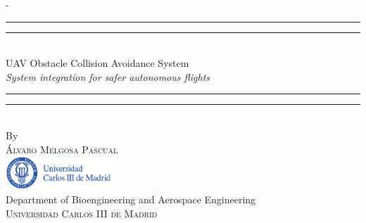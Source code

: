 %
%
% 
%
%
\begin{titlingpage}
\begin{SingleSpace}
\calccentering{\unitlength} 
\begin{adjustwidth*}{\unitlength}{-\unitlength}
\vspace*{13mm}
\begin{center}
\rule[0.5ex]{\linewidth}{2pt}\vspace*{-\baselineskip}\vspace*{3.2pt}
\rule[0.5ex]{\linewidth}{1pt}\\[\baselineskip]
{\sc \huge UAV Obstacle Collision Avoidance System }\\[4mm]
{\Large \textit{ System integration for safer autonomous flights }}\\
\rule[0.5ex]{\linewidth}{1pt}\vspace*{-\baselineskip}\vspace{3.2pt}
\rule[0.5ex]{\linewidth}{2pt}\\
\vspace{1cm}
{\large By}\\
\vspace{0.5cm}
{\large\textsc{\'Alvaro Melgosa Pascual}}\\
\vspace{2cm}
\includegraphics[trim={0 0 2.13cm 0},clip, width=0.3\textwidth]{logos/logoUC3M.pdf}\\
\vspace{1cm}
{\large Department of Bioengineering and Aerospace Engineering\\
\textsc{Universidad Carlos III de Madrid}}\\

\end{center}
\end{adjustwidth*}
\end{SingleSpace}
\end{titlingpage}
